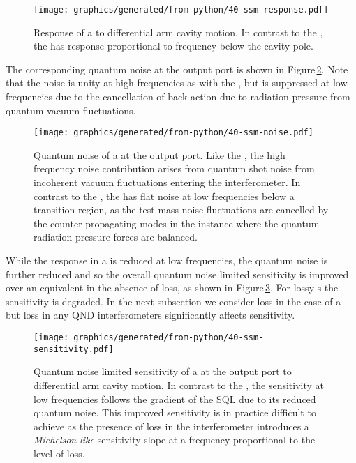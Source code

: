 \begin{figure}
  \centering
  \texttt{[image: graphics/generated/from-python/40-ssm-response.pdf]}
  \caption[Response of a \SSM{} to differential arm cavity motion]{\label{fig:ssm-response}Response of a \SSM{} to differential arm cavity motion. In contrast to the \MI{}, the \SSM{} has response proportional to frequency below the cavity pole.}
\end{figure}

The corresponding quantum noise at the output port is shown in Figure\,\ref{fig:ssm-noise}. Note that the noise is unity at high frequencies as with the \FPMI{}, but is suppressed at low frequencies due to the cancellation of back-action due to radiation pressure from quantum vacuum fluctuations. 

\begin{figure}
  \centering
  \texttt{[image: graphics/generated/from-python/40-ssm-noise.pdf]}
  \caption[Quantum noise of a \SSM{} at the output port]{\label{fig:ssm-noise}Quantum noise of a \SSM{} at the output port. Like the \MI{}, the high frequency noise contribution arises from quantum shot noise from incoherent vacuum fluctuations entering the interferometer. In contrast to the \MI{}, the \SSM{} has flat noise at low frequencies below a transition region, as the test mass noise fluctuations are cancelled by the counter-propagating modes in the instance where the quantum radiation pressure forces are balanced.}
\end{figure}

While the response in a \SSM{} is reduced at low frequencies, the quantum noise is further reduced and so the overall quantum noise limited sensitivity is improved over an equivalent \FPMI{} in the absence of loss, as shown in Figure\,\ref{fig:ssm-sensitivity}. For lossy \SM{}s the sensitivity is degraded. In the next subsection we consider loss in the case of a \SSM{} but loss in any \gls{QND} interferometers significantly affects sensitivity.

\begin{figure}
  \centering
  \texttt{[image: graphics/generated/from-python/40-ssm-sensitivity.pdf]}
  \caption[Sensitivity of a \SSM{} at the output port to differential arm cavity motion]{\label{fig:ssm-sensitivity}Quantum noise limited sensitivity of a \SSM{} at the output port to differential arm cavity motion. In contrast to the \MI{}, the \SSM{} sensitivity at low frequencies follows the gradient of the \gls{SQL} due to its reduced quantum noise. This improved sensitivity is in practice difficult to achieve as the presence of loss in the interferometer introduces a \emph{Michelson-like} sensitivity slope at a frequency proportional to the level of loss.}
\end{figure}

